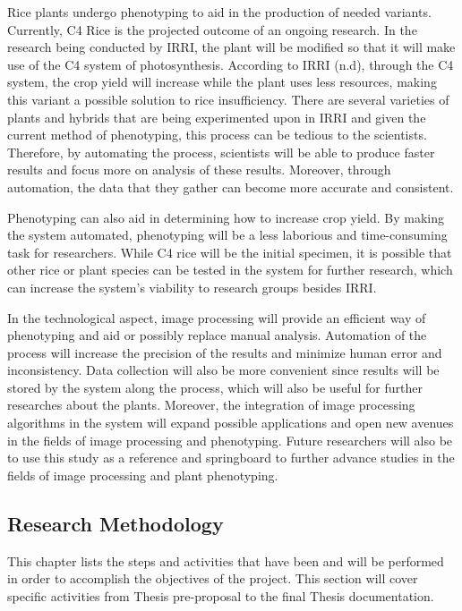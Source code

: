 Rice plants undergo phenotyping to aid in the production of needed variants. Currently, C4 Rice is the projected outcome of an ongoing research. In the research being conducted by IRRI, the plant will be modified so that it will make use of the C4 system of photosynthesis.  According to IRRI (n.d), through the C4 system, the crop yield will increase while the plant uses less resources, making this variant a possible solution to rice insufficiency.  There are several varieties of plants and hybrids that are being experimented upon in IRRI and given the current method of phenotyping, this process can be tedious to the scientists. Therefore, by automating the process, scientists will be able to produce faster results and focus more on analysis of these results. Moreover, through automation, the data that they gather can become more accurate and consistent. 

Phenotyping can also aid in determining how to increase crop yield.  By making the system automated, phenotyping will be a less laborious and time-consuming task for researchers. While C4 rice will be the initial specimen, it is possible that other rice or plant species can be tested in the system for further research, which can increase the system’s viability to research groups besides IRRI.

In the technological aspect, image processing will provide an efficient way of phenotyping and aid or possibly replace manual analysis.  Automation of the process will increase the precision of the results and minimize human error and inconsistency. Data collection will also be more convenient since results will be stored by the system along the process, which will also be useful for further researches about the plants. Moreover, the integration of image processing algorithms in the system will expand possible applications and open new avenues in the fields of image processing and phenotyping. Future researchers will also be to use this study as a reference and springboard to further advance studies in the fields of image processing and plant phenotyping.
 
\subsection{Research Methodology}
\label{sec:methodology}

This chapter lists the steps and activities that have been and will be performed in order to accomplish the objectives of the project. This section will cover specific activities from Thesis pre-proposal to the final Thesis documentation.

